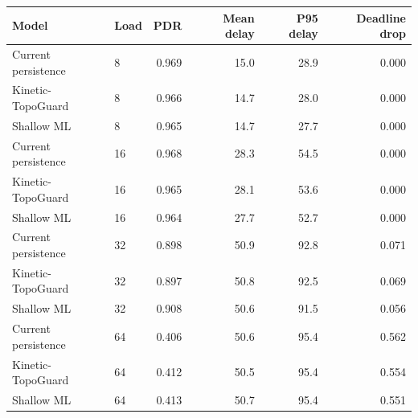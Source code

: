 \begin{tabular}{llrrrr}
\toprule
Model & Load & PDR & Mean delay & P95 delay & Deadline drop \\
\midrule
Current persistence & 8 & 0.969 & 15.0 & 28.9 & 0.000 \\
Kinetic-TopoGuard & 8 & 0.966 & 14.7 & 28.0 & 0.000 \\
Shallow ML & 8 & 0.965 & 14.7 & 27.7 & 0.000 \\
Current persistence & 16 & 0.968 & 28.3 & 54.5 & 0.000 \\
Kinetic-TopoGuard & 16 & 0.965 & 28.1 & 53.6 & 0.000 \\
Shallow ML & 16 & 0.964 & 27.7 & 52.7 & 0.000 \\
Current persistence & 32 & 0.898 & 50.9 & 92.8 & 0.071 \\
Kinetic-TopoGuard & 32 & 0.897 & 50.8 & 92.5 & 0.069 \\
Shallow ML & 32 & 0.908 & 50.6 & 91.5 & 0.056 \\
Current persistence & 64 & 0.406 & 50.6 & 95.4 & 0.562 \\
Kinetic-TopoGuard & 64 & 0.412 & 50.5 & 95.4 & 0.554 \\
Shallow ML & 64 & 0.413 & 50.7 & 95.4 & 0.551 \\
\bottomrule
\end{tabular}
